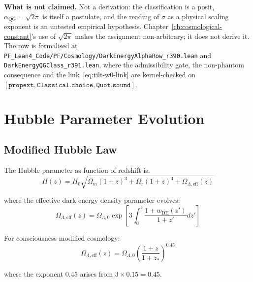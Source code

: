\begin{remark}
\noindent \textbf{What is not claimed.} Not a derivation: the classification is
a posit, $\alpha_{\text{QG}} = \sqrt{2\pi}$ is itself a postulate, and the
reading of $\sigma$ as a physical scaling exponent is an untested empirical
hypothesis. Chapter~\ref{ch:cosmological-constant}'s use of $\sqrt{2\pi}$ makes
the assignment non-arbitrary; it does not derive it. The row is formalised at
\texttt{PF\_Lean4\_Code/PF/Cosmology/DarkEnergyAlphaRow\_r390.lean} and
\texttt{DarkEnergyQGClass\_r391.lean}, where the admissibility gate, the
non-phantom consequence and the link~\eqref{eq:tilt-w0-link} are kernel-checked
on $[\texttt{propext}, \texttt{Classical.choice}, \texttt{Quot.sound}]$.
\end{remark}

\section{Hubble Parameter Evolution}

\subsection{Modified Hubble Law}

\begin{theorem}\label{thm:hubble-modified}
The Hubble parameter as function of redshift is:
\begin{equation}
\boxed{H(z) = H_0 \sqrt{\Omega_m (1+z)^3 + \Omega_r (1+z)^4 + \Omega_{\Lambda,\text{eff}}(z)}}
\end{equation}

where the effective dark energy density parameter evolves:
\begin{equation}
\Omega_{\Lambda,\text{eff}}(z) = \Omega_{\Lambda,0} \exp\left[ 3 \int_0^z \frac{1 + w_{\text{DE}}(z')}{1+z'} dz' \right]
\end{equation}

For consciousness-modified cosmology:
\begin{equation}
\Omega_{\Lambda,\text{eff}}(z) = \Omega_{\Lambda,0} \left( \frac{1+z}{1+z_*} \right)^{0.45}
\end{equation}

where the exponent 0.45 arises from $3 \times 0.15 = 0.45$.
\end{theorem}

